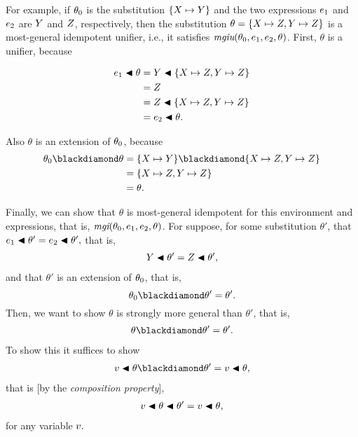 \documentclass[runningheads]{llncs}
\DeclareMathOperator{\mgi}{\emph{mgi}}
\DeclareMathOperator{\mgiu}{\emph{mgiu}}
\begin{document}
   For example, if $\theta_{0}$ is the substitution  $\{X \mapsto Y\}$ and the two expressions $e_{1}$ and $e_{2}$ are $Y$ and $Z$, respectively, then the substitution $\theta = \{X \mapsto Z, Y \mapsto Z\}$ is a most-general idempotent unifier, i.e., it satisfies 
   $\mgiu(\thet{0}, \e{1}, \e{2}, \theta)$.  First, $\theta$ is a unifier, because
   
   \begin{align*}
   e_{1} \blacktriangleleft \theta  &= Y \blacktriangleleft  \{X \mapsto Z, Y \mapsto Z\} \\
                        &= Z \\
                        &= Z \blacktriangleleft  \{X \mapsto Z, Y \mapsto Z\} \\
                        &= e_{2} \blacktriangleleft \theta.
    \end{align*}                     

Also $\theta$  is an extension of $\theta_{0}$, because
  \begin{align*}
  \thet{0} \compose \theta &= \{\var{X} \mapsto \var{Y}\} \compose \{\var{X} \mapsto \var{Z}, \var{Y} \mapsto \var{Z}\} \\
                           &= \{\var{X} \mapsto \var{Z}, \var{Y} \mapsto \var{Z} \} \\
                           &= \theta.
   \end{align*}

Finally, we can show that $\theta$ is most-general idempotent for this environment and expressions, that is,
$\mgi(\thet{0}, \e{1}, \e{2}, \theta)$.  For suppose, for some substitution $\theta'$, that
    $e_{1} \blacktriangleleft \theta' = e_{2} \blacktriangleleft \theta',$
that is,
\begin{align*}
    Y \blacktriangleleft \theta' = Z \blacktriangleleft \theta',  
\end{align*}
and that $\theta'$ is an extension of $\theta_{0}$, that is,
\[\thet{0} \compose \theta' = \theta'.\]
Then, we want to show $\theta$ is strongly more general than $\theta'$, that is,
\begin{align*}
    \theta \compose \theta'  = \theta'.
\end{align*} 
To show this it suffices to show 
\begin{align*}
    \var{v} \apply {\theta \compose \theta' } = \var{v} \apply \theta,
\end{align*}
that is [by the \emph{composition property}],
\begin{align*}
    v \blacktriangleleft \theta \blacktriangleleft \theta'  = v \blacktriangleleft \theta,
\end{align*}
for any variable $v.$
\end{document}
